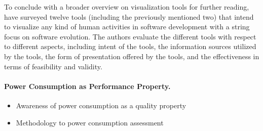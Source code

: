 To conclude with a broader overview on visualization tools for further reading,
\cite{storey_use_2005} have surveyed twelve tools (including the previously
mentioned two) that intend to visualize any kind of human activities in
software development with a string focus on software evolution. The authors
evaluate the different tools with respect to different aspects, including
intent of the tools, the information sources utilized by the tools, the form of
presentation offered by the tools, and the effectiveness in terms of
feasibility and validity.

\paragraph{Power Consumption as Performance Property.}
\begin{itemize}
  \item Awareness of power consumption as a quality property
  \citep{sahin_how_2014,li_empirical_2014}
  \item Methodology to power consumption assessment
  \citep{hindle_green_2015,hindle_greenminer:_2014}
\end{itemize}
